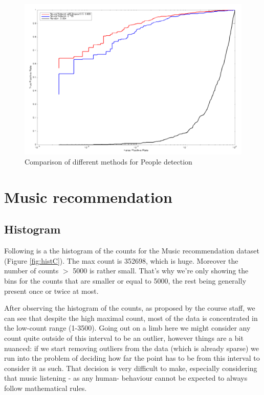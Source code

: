 \documentclass{article} %
\begin{document}
\begin{figure}
\centering
\includegraphics[width=1\textwidth]{images/TPRplot.png}
\caption{Comparison of different methods for People detection}
\label{fig:pdplot}
\end{figure}
\section{Music recommendation}
\subsection{Histogram}
Following is a the histogram of the counts for the Music recommendation dataset (Figure \ref{fig:histC}). The max count is 352698, which is huge. Moreover the number of counts $>$ 5000 is rather small. That’s why we’re only showing the bins for the counts that are smaller or equal to 5000, the rest being generally present once or twice at most.

After observing the histogram of the counts, as proposed by the course staff, we can see that despite the high maximal count, most of the data is concentrated in the low-count range (1-3500). Going out on a limb here we might consider any count quite outside of this interval to be an outlier, however things are a bit nuanced: if we start removing outliers from the data (which is already sparse) we run into the problem of deciding how far the point has to be from this interval to consider it as such. That decision is very difficult to make, especially considering that music listening - as any human-  behaviour cannot be expected to always follow mathematical rules.
\end{document}
